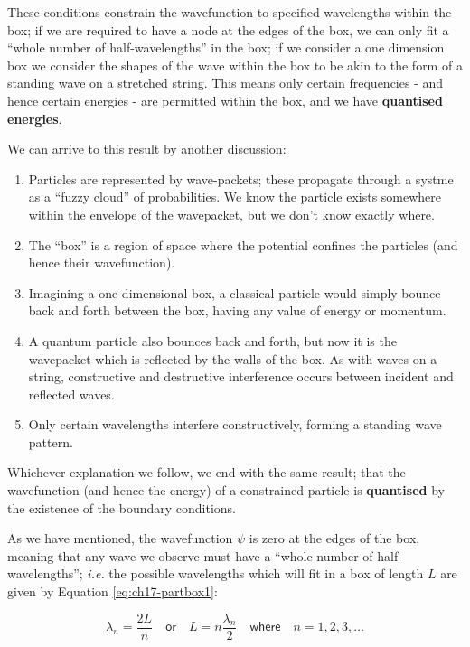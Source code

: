 \documentclass[
]{book}
\providecommand{\tightlist}{%
  \setlength{\itemsep}{0pt}\setlength{\parskip}{0pt}}
\begin{document}
These conditions constrain the wavefunction to specified wavelengths within the box; if we are required to have a node at the edges of the box, we can only fit a ``whole number of half-wavelengths'' in the box; if we consider a one dimension box we consider the shapes of the wave within the box to be akin to the form of a standing wave on a stretched string. This means only certain frequencies - and hence certain energies - are permitted within the box, and we have \textbf{quantised energies}.

We can arrive to this result by another discussion:

\begin{enumerate}
\def\labelenumi{\arabic{enumi}.}
\tightlist
\item
  Particles are represented by wave-packets; these propagate through a systme as a ``fuzzy cloud'' of probabilities. We know the particle exists somewhere within the envelope of the wavepacket, but we don't know exactly where.
\item
  The ``box'' is a region of space where the potential confines the particles (and hence their wavefunction).
\item
  Imagining a one-dimensional box, a classical particle would simply bounce back and forth between the box, having any value of energy or momentum.
\item
  A quantum particle also bounces back and forth, but now it is the wavepacket which is reflected by the walls of the box. As with waves on a string, constructive and destructive interference occurs between incident and reflected waves.
\item
  Only certain wavelengths interfere constructively, forming a standing wave pattern.
\end{enumerate}

Whichever explanation we follow, we end with the same result; that the wavefunction (and hence the energy) of a constrained particle is \textbf{quantised} by the existence of the boundary conditions.

As we have mentioned, the wavefunction \(\psi\) is zero at the edges of the box, meaning that any wave we observe must have a ``whole number of half-wavelengths''; \emph{i.e.} the possible wavelengths which will fit in a box of length \(L\) are given by Equation \eqref{eq:ch17-partbox1}:

\begin{equation}
\lambda_n = \frac{2L}{n} \quad \textsf{or} \quad L = n\frac{\lambda_n}{2} \quad \textsf{where} \quad n = 1,2,3, \dots
\label{eq:ch17-partbox1}
\end{equation}
\end{document}

